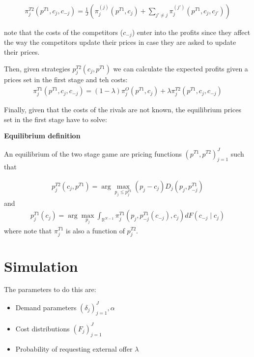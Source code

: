 \documentclass[12pt]{article}
\begin{document}
\begin{align}\label{eq:profits_external2}
    \pi_j^{T2}(p^{T1}, c_j, c_{-j}) =  \frac{1}{J} \left( \pi_j^{(j)}(p^{T1}, c_j)   + \sum_{j'\neq j} \pi_j^{(j')}(p^{T1}, c_j, c_{j'}) \right)
\end{align}


note that the costs of the competitors ($c_{-j}$) enter into the profits since they affect the way the competitors update their prices in case they are asked to update their prices.

Then, given strategies  $p_j^{T2}(c_j, p^{T1})$ we can calculate the expected profits given a prices set in the first stage and teh costs: 
\begin{align}
    \pi_j^{T1}(p^{T1}, c_j, c_{-j}) = (1-\lambda) \pi_j^O(p^{T1}, c_j) + \lambda \pi_j^{T2}(p^{T1}, c_j, c_{-j})
\end{align}

Finally, given that the costs of the rivals are not known, the equilibrium prices set in the first stage have to solve: 


\textbf{Equilibrium definition}

An equilibrium of the two stage game are pricing functions $(p^{T1}, p^{T2})_{j=1}^J$ such that 


\begin{align}\label{eq:eq_second_stage}
    p_j^{T2}(c_j, p^{T1}) = \arg \max_{p_j \leq p_j^{T1}} (p_j - c_j) D_j(p_j, p_{-j}^{T1}) 
\end{align}
and 
\begin{align}
    p_j^{T1}(c_j) = \arg \max_{p_j} \int_{\mathbb{R}^{N-1}}^{}  \pi_j^{T1}(p_j, p_{-j}^{T1}(c_{-j}), c_j) dF(c_{-j} \mid c_j)   
\end{align}
where note that $\pi_j^{T1}$ is also a function of $p_j^{T2}$. 




 
\section{Simulation}
The parameters to do this are: 
\begin{itemize}
    \item Demand parameters $(\delta_j)_{j=1}^J, \alpha$
    \item Cost distributions $(F_j)_{j=1}^J$
    \item Probability of requesting external offer $\lambda$
\end{itemize}
\end{document}
